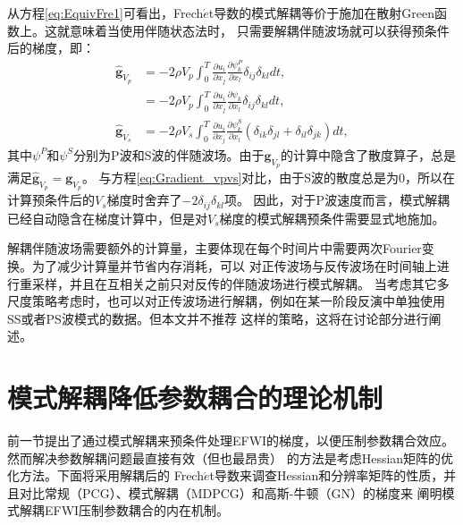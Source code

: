 从方程\eqref{eq:EquivFre1}可看出，Frech$\acute{e}$t导数的模式解耦等价于施加在散射Green函数上。这就意味着当使用伴随状态法时，
只需要解耦伴随波场就可以获得预条件后的梯度，即：
\begin{equation} 
        \begin{split} 
                \hat{\mathbf{g}}_{V_p}&=-2\rho V_p\int_{0}^{T}\frac{\partial u_i}{\partial
        x_j}\frac{\partial \psi^P_k}{\partial x_l}
        \delta_{ij}\delta_{kl}dt,\\
        &=-2\rho V_p\int_{0}^{T}\frac{\partial u_i}{\partial
        x_j}\frac{\partial \psi_k}{\partial x_l}
        \delta_{ij}\delta_{kl}dt,\\
                \hat{\mathbf{g}}_{V_s}&=-2\rho V_s\int_{0}^{T}\frac{\partial u_i}{\partial
        x_j}\frac{\partial \psi^S_k}{\partial x_l}
        (\delta_{ik}\delta_{jl}+\delta_{il}\delta_{jk})dt,
        \end{split}
        \label{eq:DeGradient_vpvs} 
\end{equation}
其中$\psi^P$和$\psi^S$分别为P波和S波的伴随波场。由于$\mathbf{g}_{V_p}$的计算中隐含了散度算子，总是满足$\hat{\mathbf{g}}_{V_p}=\mathbf{g}_{V_p}$。
与方程\eqref{eq:Gradient_vpvs}对比，由于S波的散度总是为0，所以在计算预条件后的$V_s$梯度时舍弃了$-2\delta_{ij}\delta_{kl}$项。
因此，对于P波速度而言，模式解耦已经自动隐含在梯度计算中，但是对$V_s$梯度的模式解耦预条件需要显式地施加。

解耦伴随波场需要额外的计算量，主要体现在每个时间片中需要两次Fourier变换。为了减少计算量并节省内存消耗，可以
对正传波场与反传波场在时间轴上进行重采样，并且在互相关之前只对反传的伴随波场进行模式解耦。
当考虑其它多尺度策略考虑时，也可以对正传波场进行解耦，例如在某一阶段反演中单独使用SS或者PS波模式的数据。但本文并不推荐
这样的策略，这将在讨论部分进行阐述。
\section{模式解耦降低参数耦合的理论机制}
	前一节提出了通过模式解耦来预条件处理EFWI的梯度，以便压制参数耦合效应。然而解决参数解耦问题最直接有效（但也最昂贵）
的方法是考虑Hessian矩阵的优化方法。下面将采用解耦后的
Frech$\acute{e}$t导数来调查Hessian和分辨率矩阵的性质，并且对比常规（PCG）、模式解耦（MDPCG）和高斯-牛顿（GN）的梯度来
阐明模式解耦EFWI压制参数耦合的内在机制。
